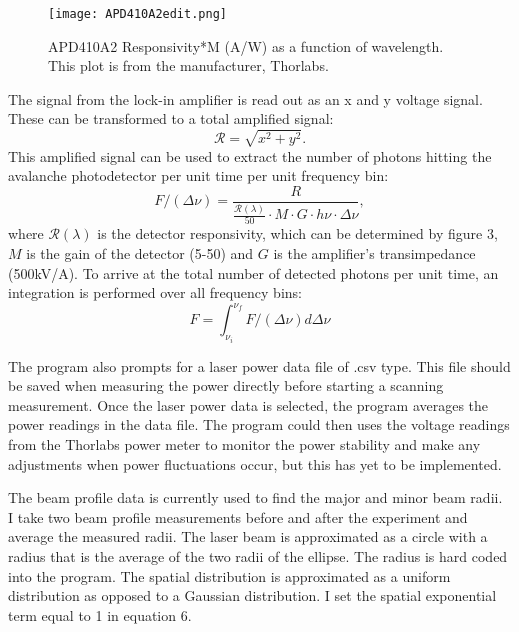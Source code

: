 \documentclass[12pt, a4paper]{article}
\begin{document}
\begin{figure}
  \vspace*{-8mm}
  \texttt{[image: APD410A2edit.png]}
  \vspace*{-6mm}
  \caption{APD410A2 Responsivity*M (A/W) as a function of wavelength. This plot is from the manufacturer, Thorlabs.}
\end{figure}


The signal from the lock-in amplifier is read out as an x and y voltage signal. These can be transformed to a total amplified signal:
\begin{equation}
\mathscr{R} = \sqrt{x^2+y^2}.
\end{equation}
This amplified signal can be used to extract the number of photons hitting the avalanche photodetector per unit time per unit frequency bin:
\begin{equation}
F/(\Delta \nu) = \frac{R}{\frac{\mathcal{R}(\lambda)}{50}\cdot M\cdot G \cdot h\nu \cdot \Delta \nu},
\end{equation}
where $\mathcal{R}(\lambda)$ is the detector responsivity, which can be determined by figure 3, $M$ is the gain of the detector (5-50) and $G$ is the amplifier's transimpedance (500kV/A). To arrive at the total number of detected photons per unit time, an integration is performed over all frequency bins:
\begin{equation}
F = \int_{\nu_i}^{\nu_f}F/(\Delta \nu)d\Delta \nu
\end{equation}

The program also prompts for a laser power data file of .csv type. This file should be saved when measuring the power directly before starting a scanning measurement. Once the laser power data is selected, the program averages the power readings in the data file. The program could then uses the voltage readings from the Thorlabs power meter to monitor the power stability and make any adjustments when power fluctuations occur, but this has yet to be implemented. 

The beam profile data is currently used to find the major and minor beam radii. I take two beam profile measurements before and after the experiment and average the measured radii.  The laser beam is approximated as a circle with a radius that is the average of the two radii of the ellipse. The radius is hard coded into the program. The spatial distribution is approximated as a uniform distribution as opposed to a Gaussian distribution. I set the spatial exponential term equal to 1 in equation 6. 
\end{document}
